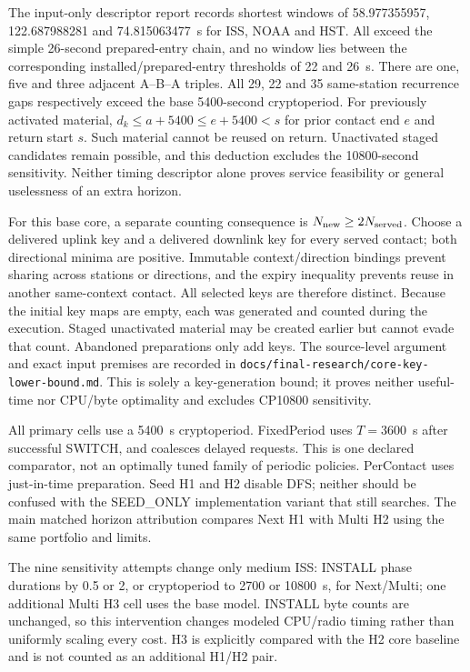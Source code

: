 \documentclass[11pt]{article}
\begin{document}
The input-only descriptor report records shortest windows of 58.977355957, 122.687988281
and 74.815063477~s for ISS, NOAA and HST. All exceed the simple 26-second prepared-entry
chain, and no window lies between the corresponding installed/prepared-entry thresholds
of 22 and 26~s. There are one, five and three adjacent A--B--A triples. All 29, 22 and 35
same-station recurrence gaps respectively exceed the base 5400-second cryptoperiod.
For previously activated material, $d_k\leq a+5400\leq e+5400<s$ for prior contact end $e$
and return start $s$. Such material cannot be reused on return. Unactivated staged candidates
remain possible, and this deduction excludes the 10800-second sensitivity. Neither timing
descriptor alone proves service feasibility or general uselessness of an extra horizon.

For this base core, a separate counting consequence is $N_{\rm new}\geq2N_{\rm served}$.
Choose a delivered uplink key and a delivered downlink key for every served contact; both
directional minima are positive. Immutable context/direction bindings prevent sharing across
stations or directions, and the expiry inequality prevents reuse in another same-context
contact. All selected keys are therefore distinct. Because the initial key maps are empty,
each was generated and counted during the execution. Staged unactivated material may be
created earlier but cannot evade that count. Abandoned preparations only add keys. The
source-level argument and exact input premises are recorded in
\texttt{docs/final-research/core-key-lower-bound.md}. This is solely a key-generation bound;
it proves neither useful-time nor CPU/byte optimality and excludes CP10800 sensitivity.

All primary cells use a 5400~s cryptoperiod. FixedPeriod uses $T=3600$~s after successful
SWITCH, and coalesces delayed requests. This is one declared comparator, not an optimally
tuned family of periodic policies. PerContact uses just-in-time preparation. Seed H1 and H2
disable DFS; neither should be confused with the SEED\_ONLY implementation variant that
still searches. The main matched horizon attribution compares Next H1 with Multi H2 using
the same portfolio and limits.

The nine sensitivity attempts change only medium ISS: INSTALL phase durations by 0.5 or 2,
or cryptoperiod to 2700 or 10800~s, for Next/Multi; one additional Multi H3 cell uses the base
model. INSTALL byte counts are unchanged, so this intervention changes modeled CPU/radio
timing rather than uniformly scaling every cost. H3 is explicitly compared with the H2 core
baseline and is not counted as an additional H1/H2 pair.
\end{document}
